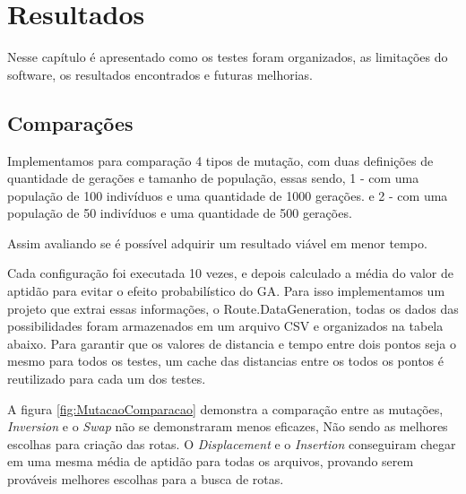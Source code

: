 \chapter{Resultados}
Nesse capítulo é apresentado como os testes foram organizados, as limitações do software, os resultados encontrados e futuras melhorias.

\section{Comparações}

Implementamos para comparação 4 tipos de mutação, com duas definições de quantidade de gerações e tamanho de população, essas sendo, 1 - com uma população de 100 indivíduos e uma quantidade de 1000 gerações. e 2 - com uma população de 50 indivíduos e uma quantidade de 500 gerações.
 
Assim avaliando se é possível adquirir um resultado viável em menor tempo. 

Cada configuração foi executada 10 vezes, e depois calculado a média do valor de aptidão para evitar o efeito probabilístico do GA. Para isso implementamos um projeto que extrai essas informações, o Route.DataGeneration, todas os dados das possibilidades foram armazenados em um arquivo CSV e organizados na tabela abaixo. 
Para garantir que os valores de distancia e tempo entre dois pontos seja o mesmo para todos os testes, um cache das distancias entre os todos os pontos é reutilizado para cada um dos testes.

\begin{center}
	\label{fig:MutacaoComparacao}
\end{center}

A figura \ref{fig:MutacaoComparacao} demonstra a comparação entre as mutações, \textit{Inversion} e o \textit{Swap} não se demonstraram menos eficazes, Não sendo as melhores escolhas para criação das rotas. O \textit{Displacement} e o \textit{Insertion} conseguiram chegar em uma mesma média de aptidão para todas os arquivos, provando serem prováveis melhores escolhas para a busca de rotas.

